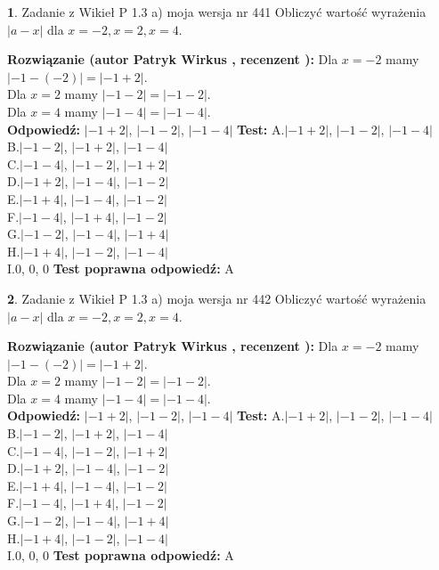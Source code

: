\documentclass[12pt, a4paper]{article}
\theoremstyle{definition} %
\newtheorem{zad}{}
\newcommand{\zadStart}[1]{\begin{zad}#1\newline}
\newcommand{\zadStop}{\end{zad}}
\newcommand{\rozwStart}[2]{\noindent \textbf{Rozwiązanie (autor #1 , recenzent #2): }\newline}
\newcommand{\rozwStop}{\newline}
\newcommand{\odpStart}{\noindent \textbf{Odpowiedź:}\newline}
\newcommand{\odpStop}{\newline}
\newcommand{\testStart}{\noindent \textbf{Test:}\newline}
\newcommand{\testStop}{\newline}
\newcommand{\kluczStart}{\noindent \textbf{Test poprawna odpowiedź:}\newline}
\newcommand{\kluczStop}{\newline}
\begin{document}
\zadStart{Zadanie z Wikieł P 1.3 a) moja wersja nr 441}
Obliczyć wartość wyrażenia $|a - x|$ dla $x=-2,x=2,x=4$.
\zadStop
\rozwStart{Patryk Wirkus}{}
Dla $x = -2$ mamy $|-1 - (-2)| = |-1 + 2|$.\\
Dla $x = 2$ mamy $|-1 - 2| = |-1 - 2|$.\\
Dla $x = 4$ mamy $|-1 - 4| = |-1 - 4|$.\\
\rozwStop
\odpStart
$|-1 + 2|$, $|-1 - 2|$, $|-1 - 4|$
\odpStop
\testStart
A.$|-1 + 2|$, $|-1 - 2|$, $|-1 - 4|$\\
B.$|-1 - 2|$, $|-1 + 2|$, $|-1 - 4|$\\
C.$|-1 - 4|$, $|-1 - 2|$, $|-1 + 2|$\\
D.$|-1 + 2|$, $|-1 - 4|$, $|-1 - 2|$\\
E.$|-1 + 4|$, $|-1 - 4|$, $|-1 - 2|$\\
F.$|-1 - 4|$, $|-1 + 4|$, $|-1 - 2|$\\
G.$|-1 - 2|$, $|-1 - 4|$, $|-1 + 4|$\\
H.$|-1 + 4|$, $|-1 - 2|$, $|-1 - 4|$\\
I.$0$, $0$, $0$
\testStop
\kluczStart
A
\kluczStop



\zadStart{Zadanie z Wikieł P 1.3 a) moja wersja nr 442}
Obliczyć wartość wyrażenia $|a - x|$ dla $x=-2,x=2,x=4$.
\zadStop
\rozwStart{Patryk Wirkus}{}
Dla $x = -2$ mamy $|-1 - (-2)| = |-1 + 2|$.\\
Dla $x = 2$ mamy $|-1 - 2| = |-1 - 2|$.\\
Dla $x = 4$ mamy $|-1 - 4| = |-1 - 4|$.\\
\rozwStop
\odpStart
$|-1 + 2|$, $|-1 - 2|$, $|-1 - 4|$
\odpStop
\testStart
A.$|-1 + 2|$, $|-1 - 2|$, $|-1 - 4|$\\
B.$|-1 - 2|$, $|-1 + 2|$, $|-1 - 4|$\\
C.$|-1 - 4|$, $|-1 - 2|$, $|-1 + 2|$\\
D.$|-1 + 2|$, $|-1 - 4|$, $|-1 - 2|$\\
E.$|-1 + 4|$, $|-1 - 4|$, $|-1 - 2|$\\
F.$|-1 - 4|$, $|-1 + 4|$, $|-1 - 2|$\\
G.$|-1 - 2|$, $|-1 - 4|$, $|-1 + 4|$\\
H.$|-1 + 4|$, $|-1 - 2|$, $|-1 - 4|$\\
I.$0$, $0$, $0$
\testStop
\kluczStart
A
\kluczStop
\end{document}
